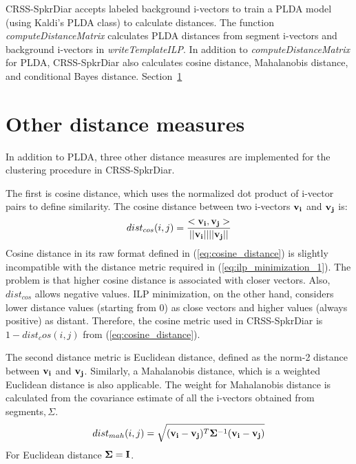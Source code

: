 CRSS-SpkrDiar accepts labeled background i-vectors to train a PLDA model (using Kaldi's PLDA class) to calculate distances. 
The function {\it computeDistanceMatrix}  calculates PLDA distances from segment i-vectors and background i-vectors in {\it writeTemplateILP}. 
In addition to {\it computeDistanceMatrix} for PLDA, CRSS-SpkrDiar also calculates cosine distance, Mahalanobis distance, and conditional Bayes distance. 
Section~\ref{sec:other_distances_ilp}

\section{Other distance measures}
\label{sec:other_distances_ilp}
In addition to PLDA, three other distance measures are implemented for the clustering procedure in CRSS-SpkrDiar. 

The first is cosine distance, which uses the normalized dot product of i-vector pairs to define similarity. The cosine distance between two i-vectors ${\bf v_i}$ and ${\bf v_j}$ is: 
\begin{equation}
\label{eq:cosine_distance}
dist_{cos}(i,j) = \frac{<{\bf v_i} , {\bf v_j} >}{|| {\bf v_i} ||||{\bf v_j}|| }
\end{equation}
Cosine distance in its raw format defined in (\ref{eq:cosine_distance}) is slightly incompatible with the distance metric required in (\ref{eq:ilp_minimization_1}). 
The problem is that higher cosine distance is associated with closer vectors. Also, $dist_{cos}$ allows negative values. 
ILP minimization, on the other hand, considers lower distance values (starting from $0$) as close vectors and higher values (always positive) as distant. 
Therefore, the cosine metric used in CRSS-SpkrDiar is $1 - dist_cos(i,j)$ from (\ref{eq:cosine_distance}). 

The second distance metric is Euclidean distance, defined as the norm-2 distance between ${\bf v_i}$ and ${\bf v_j}$. Similarly, a Mahalanobis distance, which is a weighted Euclidean distance is also applicable. The weight for Mahalanobis distance is calculated from the covariance estimate of all the i-vectors obtained from segments$, \Sigma$. 
\begin{equation}
dist_{mah}(i,j) = \sqrt{({\bf v_i} - {\bf v_j})^T{\bf \Sigma}^{-1}({\bf v_i} - {\bf v_j})}
\end{equation}
For Euclidean distance ${\bf \Sigma} = {\bf I}$. 

